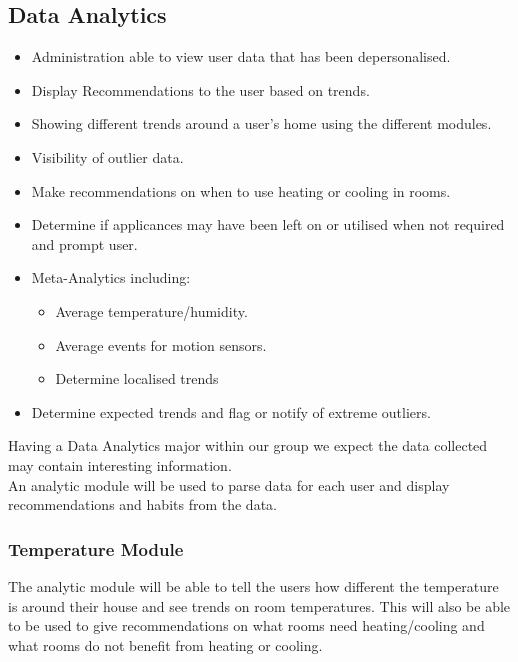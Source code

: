 \documentclass{article}
\begin{document}
            \subsection{Data Analytics}
            \begin{itemize}
                \item Administration able to view user data that has been depersonalised.
                \item Display Recommendations to the user based on trends.
                \item Showing different trends around a user’s home using the different modules.
                \item Visibility of outlier data.
                \item Make recommendations on when to use heating or cooling in rooms.
                \item Determine if applicances may have been left on or utilised when not required
                      and prompt user.
                \item Meta-Analytics including:
                \begin{itemize}
                    \item Average temperature/humidity.
                    \item Average events for motion sensors.
                    \item Determine localised trends
                \end{itemize}
                \item Determine expected trends and flag or notify of extreme outliers.
            \end{itemize}
            \noindent
            Having a Data Analytics major within our group we expect the data collected may contain interesting information. \\
            An analytic module will be used to parse data for each user and display recommendations and habits from the data.
            
            \subsubsection{Temperature Module}
                The analytic module will be able to tell the users how different the temperature is around their house and see trends on room temperatures. This will also be able to be used to give recommendations on what rooms need heating/cooling and what rooms do not benefit from heating or cooling.
\end{document}
